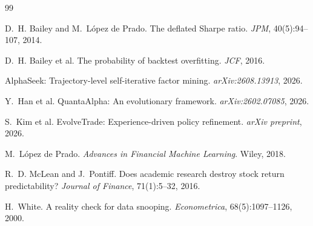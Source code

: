 \documentclass[11pt]{article}
\begin{document}

\begin{thebibliography}{99}

D.~H. Bailey and M.~L\'opez de Prado.
\newblock The deflated Sharpe ratio.
\newblock \emph{JPM}, 40(5):94--107, 2014.

D.~H. Bailey et al.
\newblock The probability of backtest overfitting.
\newblock \emph{JCF}, 2016.

\newblock AlphaSeek: Trajectory-level self-iterative factor mining.
\newblock \emph{arXiv:2608.13913}, 2026.

Y.~Han et al.
\newblock QuantaAlpha: An evolutionary framework.
\newblock \emph{arXiv:2602.07085}, 2026.

S.~Kim et al.
\newblock EvolveTrade: Experience-driven policy refinement.
\newblock \emph{arXiv preprint}, 2026.

M.~L\'opez de Prado.
\newblock \emph{Advances in Financial Machine Learning}.
\newblock Wiley, 2018.

R.~D. McLean and J.~Pontiff.
\newblock Does academic research destroy stock return predictability?
\newblock \emph{Journal of Finance}, 71(1):5--32, 2016.

H.~White.
\newblock A reality check for data snooping.
\newblock \emph{Econometrica}, 68(5):1097--1126, 2000.

\end{thebibliography}
\end{document}

